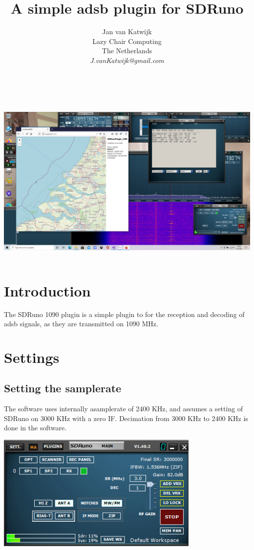 \documentclass[11pt]{article}
\begin{document}
\title{A simple adsb plugin for SDRuno}
\author{
Jan van Katwijk\\
Lazy Chair Computing \\
The Netherlands\\
{\em J.vanKatwijk@gmail.com}}
\maketitle
\ \\
\ \\
\includegraphics[width=140mm]{1090.png}
\ \\
\section{Introduction}
The SDRuno 1090 plugin is a simple plugin to for the reception and decoding
of adsb signals, as they are transmitted on 1090 MHz.

\section{Settings}
\subsection{Setting the samplerate}
The software uses internally asamplerate of 2400 KHz, and
assumes a setting of SDRuno on 3000 KHz  with a zero IF. Decimation
from 3000 KHz to 2400 KHz is done in the software.

\includegraphics[width=100mm]{main-widget.png}
\end{document}
